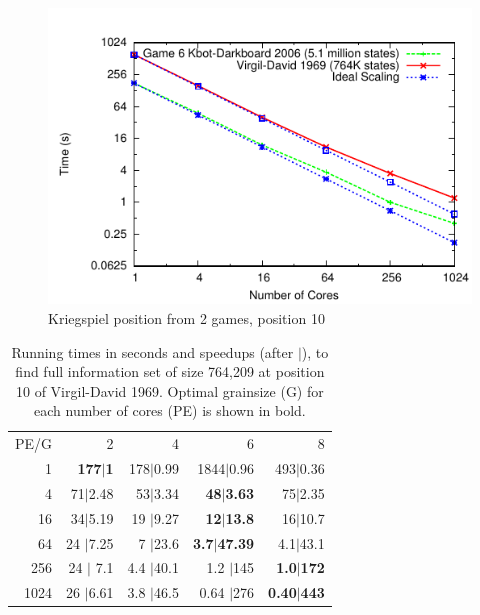 \documentclass[10pt, conference, compsocconf]{IEEEtran}
\begin{document}
\begin{figure}[ht]
 \centering \includegraphics[scale=1]{plots/new.pdf} %
\caption{Kriegspiel position from 2 games, position 10}
\label{prob4} 
\end{figure}

\begin{table}[ht]
\caption{Running times in seconds and speedups (after $|$), to find full
information set of size 764,209 at position 10 of Virgil-David 1969. Optimal
grainsize (G) for each number of cores (PE) is shown in bold.}


\centering
\begin{tabular}{rrrrr}
PE/G & 2 & 4 & 6 & 8 \\
1 & {\bf 177$|$1} & 178$|$0.99 & 1844$|$0.96 & 493$|$0.36 \\
4 & 71$|$2.48 & 53$|$3.34 & {\bf 48$|$3.63} & 75$|$2.35 \\
16 & 34$|$5.19 & 19 $|$9.27& {\bf 12$|$13.8} & 16$|$10.7 \\
64 & 24 $|$7.25 & 7 $|$23.6& {\bf 3.7$|$47.39} & 4.1$|$43.1 \\
256 & 24 $|$ 7.1& 4.4 $|$40.1 & 1.2 $|$145& {\bf 1.0$|$172} \\
1024 & 26 $|$6.61 & 3.8 $|$46.5& 0.64 $|$276& {\bf 0.40$|$443}
\end{tabular}

\label{tab:prob4}
\end{table}
\end{document}
